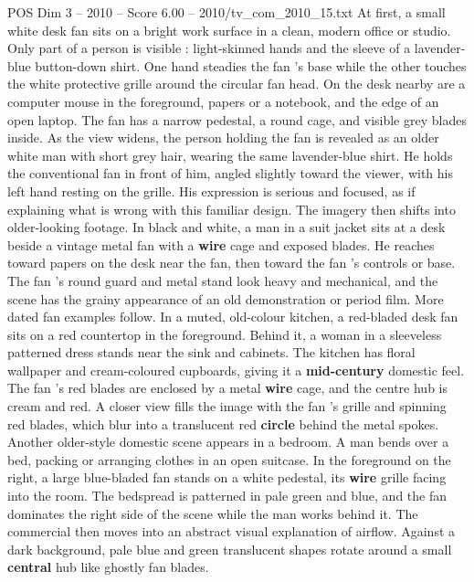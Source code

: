 \begin{textsample}{POS Dim 3 – 2010 – Score 6.00 – 2010/tv\_com\_2010\_15.txt}  \label{ex:f3_pos_081}
At first, a small white desk fan sits on a bright work surface in a clean, modern office or studio.
Only part of a person is visible : light-skinned hands and the sleeve of a lavender-blue button-down shirt.
One hand steadies the fan ’s base while the other touches the white protective grille around the circular fan head.
On the desk nearby are a computer mouse in the foreground, papers or a notebook, and the edge of an open laptop.
The fan has a narrow pedestal, a round cage, and visible grey blades inside.
As the view widens, the person holding the fan is revealed as an older white man with short grey hair, wearing the same lavender-blue shirt.
He holds the conventional fan in front of him, angled slightly toward the viewer, with his left hand resting on the grille.
His expression is serious and focused, as if explaining what is wrong with this familiar design.
The imagery then shifts into older-looking footage.
In black and white, a man in a suit jacket sits at a desk beside a vintage metal fan with a \textbf{wire} cage and exposed blades.
He reaches toward papers on the desk near the fan, then toward the fan ’s controls or base.
The fan ’s round guard and metal stand look heavy and mechanical, and the scene has the grainy appearance of an old demonstration or period film.
More dated fan examples follow.
In a muted, old-colour kitchen, a red-bladed desk fan sits on a red countertop in the foreground.
Behind it, a woman in a sleeveless patterned dress stands near the sink and cabinets.
The kitchen has floral wallpaper and cream-coloured cupboards, giving it a \textbf{mid-century} domestic feel.
The fan ’s red blades are enclosed by a metal \textbf{wire} cage, and the centre hub is cream and red.
A closer view fills the image with the fan ’s grille and spinning red blades, which blur into a translucent red \textbf{circle} behind the metal spokes.
Another older-style domestic scene appears in a bedroom.
A man bends over a bed, packing or arranging clothes in an open suitcase.
In the foreground on the right, a large blue-bladed fan stands on a white pedestal, its \textbf{wire} grille facing into the room.
The bedspread is patterned in pale green and blue, and the fan dominates the right side of the scene while the man works behind it.
The commercial then moves into an abstract visual explanation of airflow.
Against a dark background, pale blue and green translucent shapes rotate around a small \textbf{central} hub like ghostly fan blades.

\end{textsample}
